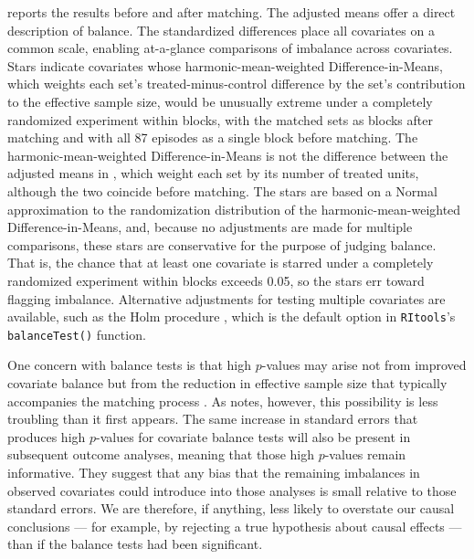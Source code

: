\documentclass[twoside,11pt]{article}
\begin{document}
 reports the results before and after matching.
The adjusted means offer a direct description of balance. The standardized differences place all
covariates on a common scale, enabling at-a-glance comparisons of
imbalance across covariates. Stars indicate covariates whose harmonic-mean-weighted Difference-in-Means,
which weights each set's treated-minus-control difference by the set's
contribution to the effective sample size, would be unusually extreme under a
completely randomized experiment within blocks, with the matched sets as blocks
after matching and with all 87 episodes as a single block before matching. The
harmonic-mean-weighted Difference-in-Means is not the difference between the
adjusted means in , which weight each set by its number
of treated units, although the two coincide before matching. The stars are
based on a Normal approximation to the randomization distribution of the
harmonic-mean-weighted Difference-in-Means, and, because no adjustments are
made for multiple comparisons, these stars are conservative for the purpose of
judging balance. That is, the chance that
at least one covariate is starred under a completely randomized
experiment within blocks exceeds 0.05, so the stars err toward
flagging imbalance.
Alternative adjustments for testing multiple covariates are available, such as the Holm
procedure \citep{holm1979}, which is the default option in
\texttt{RItools}'s \texttt{balanceTest()} function.

One concern with balance tests is that high \(p\)-values may arise not
from improved covariate balance but from the reduction in effective
sample size that typically accompanies the matching process
\citep{austin2008, imaietal2008}. As \citet{hansen2008b} notes, however,
this possibility is less troubling than it first appears. The same
increase in standard errors that produces high \(p\)-values for
covariate balance tests will also be present in subsequent outcome
analyses, meaning that those high \(p\)-values remain informative. They
suggest that any bias that the remaining imbalances in observed
covariates could introduce into those analyses is small relative to those
standard errors. We are therefore, if anything, less likely to overstate
our causal conclusions --- for example, by rejecting a true hypothesis about
causal effects --- than if the balance tests had been significant.
\end{document}
